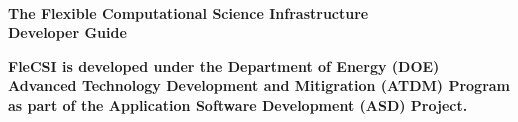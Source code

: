 

\begin{titlepage}
\vfill
\begin{center}
\vspace*{2cm}
\\
\vspace{-1.5cm}
\large{\textbf{The Flexible Computational Science Infrastructure}}
\\
\vspace{0.75cm}
\Huge{\textbf{Developer Guide}}
\end{center}
\vfill
\end{titlepage}

\thispagestyle{empty}

{\large
\textbf{FleCSI is developed under the Department of Energy (DOE)
Advanced Technology Development and Mitigration (ATDM) Program as
part of the Application Software Development (ASD) Project.}
}

\vspace{0.25cm}

